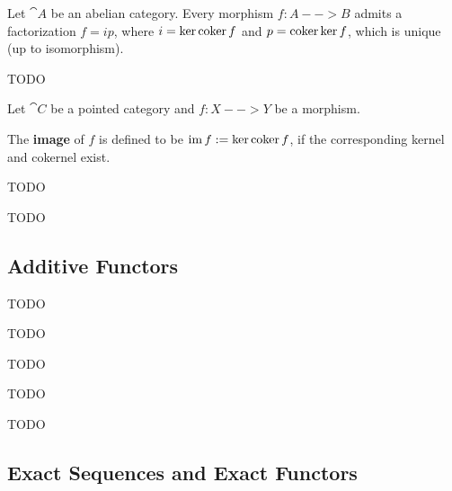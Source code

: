 	\begin{theorem}
		Let $\cat{A}$ be an abelian category. Every morphism $f:A-->B$ admits a factorization $f=ip$, where $i = \ker \operatorname{coker} f$ and $p = \operatorname{coker} \ker f$, which is unique (up to isomorphism).
	\end{theorem}
	\begin{sketch}
		TODO
	\end{sketch}

	\begin{definition}[Image]
		Let $\cat{C}$ be a pointed category and $f:X-->Y$ be a morphism.

		The \textbf{image} of $f$ is defined to be $\operatorname{im} f := \ker \operatorname{coker} f$, if the corresponding kernel and cokernel exist.
	\end{definition}

	\begin{theorem}
		TODO
	\end{theorem}

	\begin{definition}[Quotient]
		TODO
	\end{definition}


	\subsection{Additive Functors}

	\begin{definition}
		TODO
	\end{definition}

	\begin{lemma}
		TODO
	\end{lemma}

	\begin{lemma}
		TODO
	\end{lemma}

	\begin{theorem}
		TODO
	\end{theorem}

	\begin{proposition}
		TODO
	\end{proposition}

	\subsection{Exact Sequences and Exact Functors}

